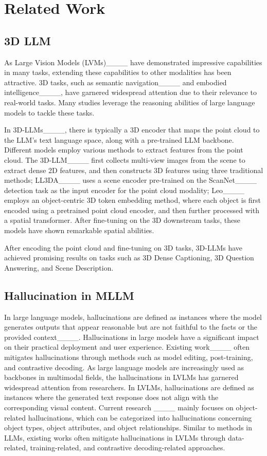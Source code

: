 \section{Related Work}
\label{sec::related}
\subsection{3D LLM}

As Large Vision Models (LVMs)____ have demonstrated impressive capabilities in many tasks, extending these capabilities to other modalities has been attractive. 3D tasks, such as semantic navigation____ and embodied intelligence____, have garnered widespread attention due to their relevance to real-world tasks. Many studies leverage the reasoning abilities of large language models to tackle these tasks.

In 3D-LLMs____, there is typically a 3D encoder that maps the point cloud to the LLM's text language space, along with a pre-trained LLM backbone. Different models employ various methods to extract features from the point cloud.
The 3D-LLM____ first collects multi-view images from the scene to extract dense 2D features, and then constructs 3D features using three traditional methods; LL3DA____ uses a scene encoder pre-trained on the ScanNet____ detection task as the input encoder for the point cloud modality; Leo____ employs an object-centric 3D token embedding method, where each object is first encoded using a pretrained point cloud encoder, and then further processed with a spatial transformer. After fine-tuning on the 3D downstream tasks, these models have shown remarkable spatial abilities.

After encoding the point cloud and fine-tuning on 3D tasks, 3D-LLMs have achieved promising results on tasks such as 3D Dense Captioning, 3D Question Answering, and Scene Description.

\subsection{Hallucination in MLLM}

In large language models, hallucinations are defined as instances where the model generates outputs that appear reasonable but are not faithful to the facts or the provided context____. Hallucinations in large models have a significant impact on their practical deployment and user experience. Existing work____ often mitigates hallucinations through methods such as model editing, post-training, and contrastive decoding. As large language models are increasingly used as backbones in multimodal fields, the hallucinations in LVLMs has garnered widespread attention from researchers. In LVLMs, hallucinations are defined as instances where the generated text response does not align with the corresponding visual content. Current research ____ mainly focuses on object-related hallucinations, which can be categorized into hallucinations concerning object types, object attributes, and object relationships. Similar to methods in LLMs, existing works often mitigate hallucinations in LVLMs through data-related, training-related, and contrastive decoding-related approaches.


